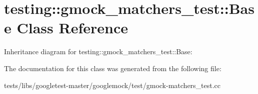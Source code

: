 \hypertarget{classtesting_1_1gmock__matchers__test_1_1Base}{}\section{testing\+:\+:gmock\+\_\+matchers\+\_\+test\+:\+:Base Class Reference}
\label{classtesting_1_1gmock__matchers__test_1_1Base}


Inheritance diagram for testing\+:\+:gmock\+\_\+matchers\+\_\+test\+:\+:Base\+:


The documentation for this class was generated from the following file\+:\begin{DoxyCompactItemize}
\item 
tests/libs/googletest-\/master/googlemock/test/gmock-\/matchers\+\_\+test.\+cc\end{DoxyCompactItemize}
